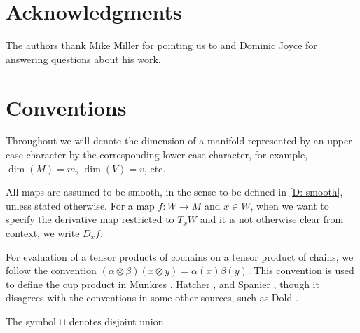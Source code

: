 \section*{Acknowledgments}

The authors thank Mike Miller for pointing us to \cite{Lipy14} and Dominic Joyce for answering questions about his work.

\section*{Conventions}

Throughout we will denote the dimension of a manifold represented by an upper case character by the corresponding lower case character, for example, $\dim(M) = m$, $\dim(V) = v$, etc.

All maps are assumed to be smooth, in the sense to be defined in \cref{D: smooth}, unless stated otherwise. 
For a map $f \colon W \to M$ and $x \in W$, when we want to specify the derivative map restricted to $T_xW$ and it is not otherwise clear from context, we write $D_xf$.


For evaluation of a tensor products of cochains on a tensor product of chains, we follow the convention  $(\alpha \otimes \beta)(x\otimes y) = \alpha(x)\beta(y)$.
This convention is used to define the cup product in Munkres \cite[Section 60]{Mun84}, Hatcher \cite[Section 3.2]{Hatc02}, and Spanier \cite[Section 5.6]{Span81}, though it disagrees with the conventions in some other sources, such as Dold \cite[Section VII.7]{Dol72}.

The symbol $\sqcup$ denotes disjoint union.